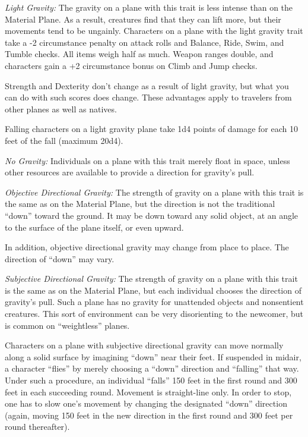 \documentclass{article}
\begin{document}
\textit{Light Gravity: }The gravity on a plane with this trait is less intense 
than on the Material Plane. As a result, creatures find that they can lift more, 
but their movements tend to be ungainly. Characters on a plane with the light gravity 
trait take a -2 circumstance penalty on attack rolls and Balance, Ride, Swim, and 
Tumble checks. All items weigh half as much. Weapon ranges double, and characters 
gain a +2 circumstance bonus on Climb and Jump checks.

Strength and Dexterity don't change as a result of light gravity, but what you 
can do with such scores does change. These advantages apply to travelers from other 
planes as well as natives.

Falling characters on a light gravity plane take 1d4 points of damage for each 
10 feet of the fall (maximum 20d4).

\textit{No Gravity: }Individuals on a plane with this trait merely float in space, 
unless other resources are available to provide a direction for gravity's pull.

\textit{Objective Directional Gravity: }The strength of gravity on a plane with 
this trait is the same as on the Material Plane, but the direction is not the traditional 
``down'' toward the ground. It may be down toward any solid object, at an angle 
to the surface of the plane itself, or even upward.

In addition, objective directional gravity may change from place to place. The 
direction of ``down'' may vary.

\textit{Subjective Directional Gravity: }The strength of gravity on a plane with 
this trait is the same as on the Material Plane, but each individual chooses the 
direction of gravity's pull. Such a plane has no gravity for unattended objects 
and nonsentient creatures. This sort of environment can be very disorienting to 
the newcomer, but is common on ``weightless'' planes.

Characters on a plane with subjective directional gravity can move normally along 
a solid surface by imagining ``down'' near their feet. If suspended in midair, 
a character ``flies'' by merely choosing a ``down'' direction and ``falling'' that 
way. Under such a procedure, an individual ``falls'' 150 feet in the first round 
and 300 feet in each succeeding round. Movement is straight-line only. In order 
to stop, one has to slow one's movement by changing the designated ``down'' direction 
(again, moving 150 feet in the new direction in the first round and 300 feet per 
round thereafter).
\end{document}
